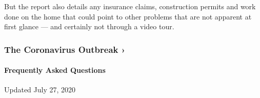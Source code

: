 But the report also details any insurance claims, construction permits
and work done on the home that could point to other problems that are
not apparent at first glance --- and certainly not through a video tour.

\href{https://www.nytimes3xbfgragh.onion/news-event/coronavirus?action=click\&pgtype=Article\&state=default\&region=MAIN_CONTENT_3\&context=storylines_faq}{}

\hypertarget{the-coronavirus-outbreak-}{%
\subsubsection{The Coronavirus Outbreak
›}\label{the-coronavirus-outbreak-}}

\hypertarget{frequently-asked-questions}{%
\paragraph{Frequently Asked
Questions}\label{frequently-asked-questions}}

Updated July 27, 2020

